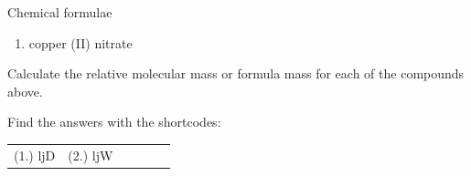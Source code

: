 \begin{exercises}{Chemical formulae
        }
\begin{enumerate}[noitemsep, label=\textbf{\arabic*}. ]
\begin{enumerate}[noitemsep, label=\textbf{\alph*}. ]
    \item copper (II) nitrate
  \end{enumerate}
Calculate the relative molecular mass or formula mass for each of the compounds above.
                \end{enumerate}
\label{m38689*cid121}
\practiceinfo
\par {} Find the answers with the shortcodes:
 \par \begin{tabular}[h]{cccccc}
 (1.) ljD  &  (2.) ljW  & \end{tabular}
\end{exercises}
            \nopagebreak
